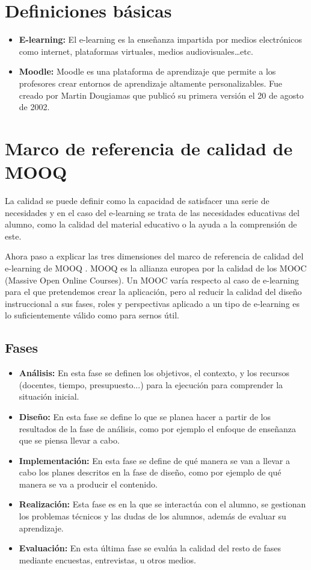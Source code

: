 

\section{Definiciones básicas}

\begin{itemize}
	\item \textbf{E-learning:}
	El e-learning es la enseñanza impartida por medios electrónicos como internet, plataformas virtuales, medios audiovisuales…etc.
	\item \textbf{Moodle:}
	Moodle es una plataforma de aprendizaje que permite a los profesores crear entornos de aprendizaje altamente personalizables. Fue creado por Martin Dougiamas que publicó su primera versión el 20 de agosto de 2002\cite{dougiamas2002interpretive}.
\end{itemize}


\section{Marco de referencia de calidad de MOOQ}
La calidad se puede definir como la capacidad de satisfacer una serie de necesidades y en el caso del e-learning se trata de las necesidades educativas del alumno, como la calidad del material educativo o la ayuda a la comprensión de este.

Ahora paso a explicar las tres dimensiones del marco de referencia de calidad del e-learning de MOOQ \cite{stracke2018quality}. MOOQ es la allianza europea por la calidad de los MOOC (Massive Open Online Courses). Un MOOC varía respecto al caso de e-learning para el que pretendemos crear la aplicación, pero al reducir la calidad del diseño instruccional a sus fases, roles y perspectivas aplicado a un tipo de e-learning es lo suficientemente válido como para sernos útil.
\subsection{Fases}
\begin{itemize}
	\item \textbf{Análisis:}
	En esta fase se definen los objetivos, el contexto, y los recursos (docentes, tiempo, presupuesto...) para la ejecución para comprender la situación inicial.
	\item \textbf{Diseño:}
	En esta fase se define lo que se planea hacer a partir de los resultados de la fase de análisis, como por ejemplo el enfoque de enseñanza que se piensa llevar a cabo.
	\item \textbf{Implementación:}
	En esta fase se define de qué manera se van a llevar a cabo los planes descritos en la fase de diseño, como por ejemplo de qué manera se va a producir el contenido.
	\item \textbf{Realización:}
	Esta fase es en la que se interactúa con el alumno, se gestionan los problemas técnicos y las dudas de los alumnos, además de evaluar su aprendizaje.
	\item \textbf{Evaluación:}
	En esta última fase se evalúa la calidad del resto de fases mediante encuestas, entrevistas, u otros medios.
\end{itemize}

